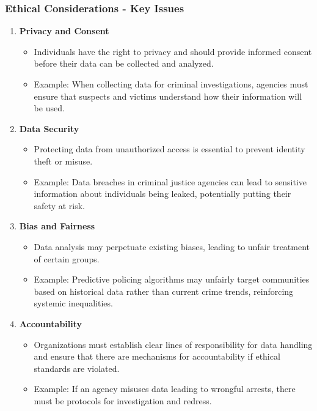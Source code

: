 \documentclass[aspectratio=169]{beamer}
\begin{document}
\begin{frame}[fragile]
    \frametitle{Ethical Considerations - Key Issues}
    \begin{enumerate}
        \item \textbf{Privacy and Consent}
        \begin{itemize}
            \item Individuals have the right to privacy and should provide informed consent before their data can be collected and analyzed.
            \item Example: When collecting data for criminal investigations, agencies must ensure that suspects and victims understand how their information will be used.
        \end{itemize}

        \item \textbf{Data Security}
        \begin{itemize}
            \item Protecting data from unauthorized access is essential to prevent identity theft or misuse.
            \item Example: Data breaches in criminal justice agencies can lead to sensitive information about individuals being leaked, potentially putting their safety at risk.
        \end{itemize}

        \item \textbf{Bias and Fairness}
        \begin{itemize}
            \item Data analysis may perpetuate existing biases, leading to unfair treatment of certain groups.
            \item Example: Predictive policing algorithms may unfairly target communities based on historical data rather than current crime trends, reinforcing systemic inequalities.
        \end{itemize}

        \item \textbf{Accountability}
        \begin{itemize}
            \item Organizations must establish clear lines of responsibility for data handling and ensure that there are mechanisms for accountability if ethical standards are violated.
            \item Example: If an agency misuses data leading to wrongful arrests, there must be protocols for investigation and redress.
        \end{itemize}
    \end{enumerate}
\end{frame}
\end{document}
